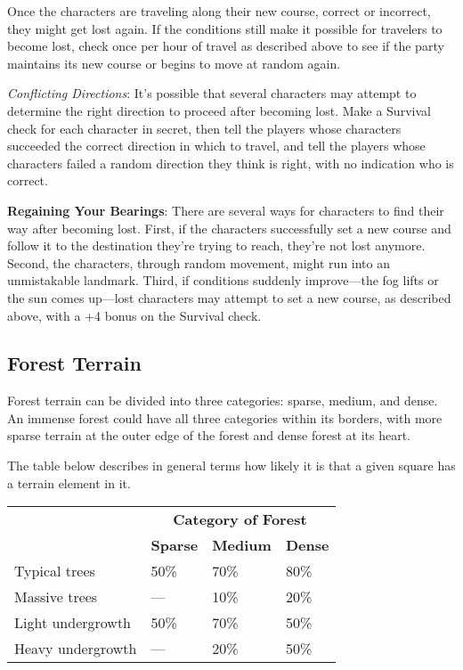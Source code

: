 Once the characters are traveling along their new course, correct or incorrect, they might get lost again. If the conditions still make it possible for travelers to become lost, check once per hour of travel as described above to see if the party maintains its new course or begins to move at random again.
				
\textit{Conflicting Directions}: It's possible that several characters may attempt to determine the right direction to proceed after becoming lost. Make a Survival check for each character in secret, then tell the players whose characters succeeded the correct direction in which to travel, and tell the players whose characters failed a random direction they think is right, with no indication who is correct.
				
\textbf{Regaining Your Bearings}: There are several ways for characters to find their way after becoming lost. First, if the characters successfully set a new course and follow it to the destination they're trying to reach, they're not lost anymore. Second, the characters, through random movement, might run into an unmistakable landmark. Third, if conditions suddenly improve---the fog lifts or the sun comes up---lost characters may attempt to set a new course, as described above, with a +4 bonus on the Survival check.
				
\subsection{Forest Terrain}

				
Forest terrain can be divided into three categories: sparse, medium, and dense. An immense forest could have all three categories within its borders, with more sparse terrain at the outer edge of the forest and dense forest at its heart. 
				
The table below describes in general terms how likely it is that a given square has a terrain element in it.

\begin{tabular}{llll}
 & \multicolumn{3}{c}{\textbf{Category of Forest}} \\
 & \textbf{Sparse} & \textbf{Medium} & \textbf{Dense}\\
Typical trees& 50\% & 70\% & 80\%\\
Massive trees & --- & 10\% & 20\%\\
Light undergrowth & 50\%  & 70\% & 50\%\\
Heavy undergrowth & --- & 20\% & 50\%\\
\end{tabular}
				
